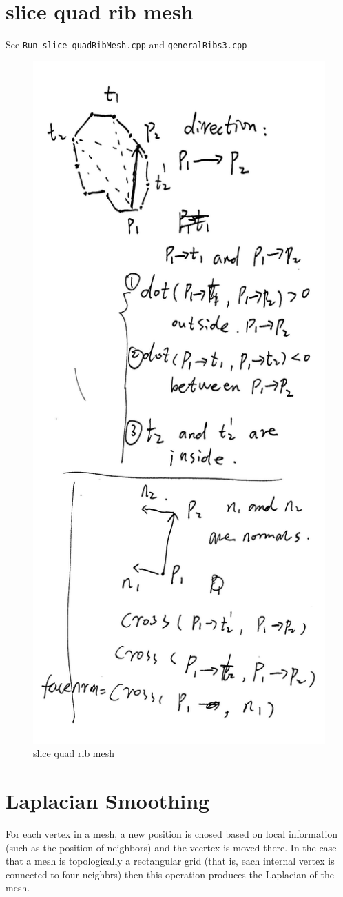 \section{slice quad rib mesh}
See \lstinline[language=C++]|Run_slice_quadRibMesh.cpp| and \lstinline[language=C++]|generalRibs3.cpp|
\begin{figure}[h!]
	\centering
	\includegraphics[width=0.7\linewidth]{Figures/slice_quadRibMesh}
	\caption{slice quad rib mesh}
	\label{fig:slicequadribmesh}
\end{figure}

\section{Laplacian Smoothing}
For each vertex in a mesh, a new position is chosed based on local information (such as the position of neighbors) and the veertex is moved there. In the case that a mesh is topologically a rectangular grid (that is, each internal vertex is connected to four neighbrs) then this operation produces the Laplacian of the mesh.

